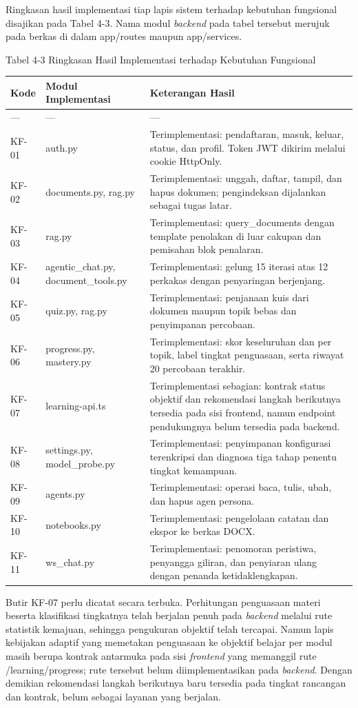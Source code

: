 \documentclass[12pt,a4paper]{article}
\begin{document}
Ringkasan hasil implementasi tiap lapis sistem terhadap kebutuhan fungsional disajikan pada Tabel 4-3. Nama modul \textit{backend} pada tabel tersebut merujuk pada berkas di dalam app/routes maupun app/services.

Tabel 4-3	Ringkasan Hasil Implementasi terhadap Kebutuhan Fungsional

\begin{table}[h]
\centering
\begin{tabular}{lll}
\toprule
Kode & Modul Implementasi & Keterangan Hasil \\
\midrule
--- & --- & --- \\
KF-01 & auth.py & Terimplementasi: pendaftaran, masuk, keluar, status, dan profil. Token JWT dikirim melalui cookie HttpOnly. \\
KF-02 & documents.py, rag.py & Terimplementasi: unggah, daftar, tampil, dan hapus dokumen; pengindeksan dijalankan sebagai tugas latar. \\
KF-03 & rag.py & Terimplementasi: query\_documents dengan template penolakan di luar cakupan dan pemisahan blok penalaran. \\
KF-04 & agentic\_chat.py, document\_tools.py & Terimplementasi: gelung 15 iterasi atas 12 perkakas dengan penyaringan berjenjang. \\
KF-05 & quiz.py, rag.py & Terimplementasi: penjanaan kuis dari dokumen maupun topik bebas dan penyimpanan percobaan. \\
KF-06 & progress.py, mastery.py & Terimplementasi: skor keseluruhan dan per topik, label tingkat penguasaan, serta riwayat 20 percobaan terakhir. \\
KF-07 & learning-api.ts & Terimplementasi sebagian: kontrak status objektif dan rekomendasi langkah berikutnya tersedia pada sisi frontend, namun endpoint pendukungnya belum tersedia pada backend. \\
KF-08 & settings.py, model\_probe.py & Terimplementasi: penyimpanan konfigurasi terenkripsi dan diagnosa tiga tahap penentu tingkat kemampuan. \\
KF-09 & agents.py & Terimplementasi: operasi baca, tulis, ubah, dan hapus agen persona. \\
KF-10 & notebooks.py & Terimplementasi: pengelolaan catatan dan ekspor ke berkas DOCX. \\
KF-11 & ws\_chat.py & Terimplementasi: penomoran peristiwa, penyangga giliran, dan penyiaran ulang dengan penanda ketidaklengkapan. \\
\bottomrule
\end{tabular}
\end{table}
Butir KF-07 perlu dicatat secara terbuka. Perhitungan penguasaan materi beserta klasifikasi tingkatnya telah berjalan penuh pada \textit{backend} melalui rute statistik kemajuan, sehingga pengukuran objektif telah tercapai. Namun lapis kebijakan adaptif yang memetakan penguasaan ke objektif belajar per modul masih berupa kontrak antarmuka pada sisi \textit{frontend} yang memanggil rute /learning/progress; rute tersebut belum diimplementasikan pada \textit{backend}. Dengan demikian rekomendasi langkah berikutnya baru tersedia pada tingkat rancangan dan kontrak, belum sebagai layanan yang berjalan.
\end{document}

